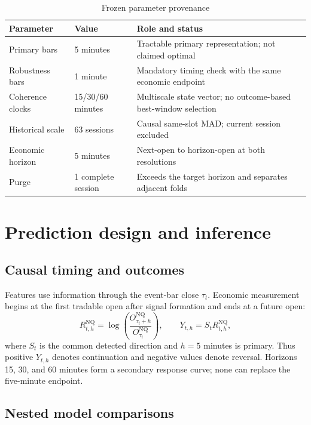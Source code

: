 \documentclass[11pt]{article}
\newcommand{\NQ}{\mathrm{NQ}}
\begin{document}
\begin{table}[!htbp]
  \centering
  \caption{Frozen parameter provenance}
  \label{tab:parameters}
  \small
  \begin{tabular}{L{0.27\textwidth}L{0.18\textwidth}L{0.44\textwidth}}
    \toprule
    Parameter & Value & Role and status \\
    \midrule
    Primary bars & 5 minutes & Tractable primary representation; not claimed optimal \\
    Robustness bars & 1 minute & Mandatory timing check with the same economic endpoint \\
    Coherence clocks & 15/30/60 minutes & Multiscale state vector; no outcome-based best-window selection \\
    Historical scale & 63 sessions & Causal same-slot MAD; current session excluded \\
    Economic horizon & 5 minutes & Next-open to horizon-open at both resolutions \\
    Purge & 1 complete session & Exceeds the target horizon and separates adjacent folds \\
    \bottomrule
  \end{tabular}
\end{table}

\section{Prediction design and inference}

\subsection{Causal timing and outcomes}

Features use information through the event-bar close $\tau_t$. Economic measurement
begins at the first tradable open after signal formation and ends at a future open:
\begin{equation}
  R^{\NQ}_{t,h}=\log\!\left(\frac{O^{\NQ}_{\tau_t+h}}{O^{\NQ}_{\tau_t}}\right),
  \qquad
  Y_{t,h}=S_t R^{\NQ}_{t,h},
  \label{eq:return}
\end{equation}
where $S_t$ is the common detected direction and $h=5$ minutes is primary. Thus positive
$Y_{t,h}$ denotes continuation and negative values denote reversal. Horizons 15, 30, and
60 minutes form a secondary response curve; none can replace the five-minute endpoint.

\subsection{Nested model comparisons}
\end{document}
